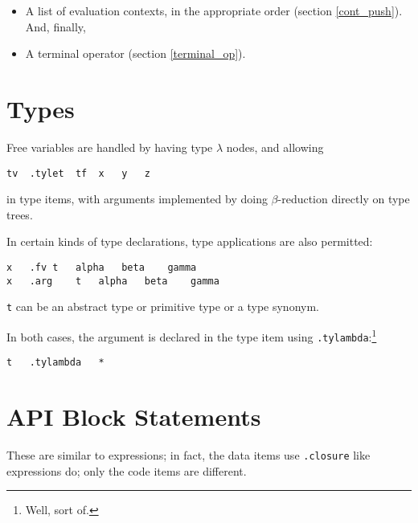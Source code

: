 \documentclass{report}
\newcommand\future[1]{\footnote{\textbf{Future direction:} #1}}
\begin{document}
\begin{itemize}
        intermixed in the appropriate order,\future{We plan to support recursion, at which point the only restriction will be that forward references will have to be to variables with type signatures.}
        consisting of
        \begin{itemize}
            \item Thunk allocations (section \ref{thunk_alloc}); and
            \item Value allocations (section \ref{value_alloc}).
        \end{itemize}
    \item A list of evaluation contexts, in the appropriate order (section \ref{cont_push}).
        And, finally,
    \item A terminal operator (section \ref{terminal_op}).
\end{itemize}

\chapter{Types}

Free variables are handled by having type $\lambda$ nodes, and allowing
\begin{verbatim}
tv	.tylet	tf	x	y	z
\end{verbatim}
in type items, with arguments implemented by doing $\beta$-reduction directly on type trees.

In certain kinds of type declarations, type applications are also permitted:
\begin{verbatim}
x	.fv	t	alpha	beta	gamma
x	.arg	t	alpha	beta	gamma
\end{verbatim}
\verb+t+ can be an abstract type or primitive type or a type synonym.

In both cases, the argument is declared in the type item using \verb+.tylambda+:\footnote{Well, sort of.}
\begin{verbatim}
t	.tylambda	*
\end{verbatim}

\chapter{API Block Statements}

These are similar to expressions;
in fact, the data items use \verb+.closure+ like expressions do;
only the code items are different.
\end{document}
